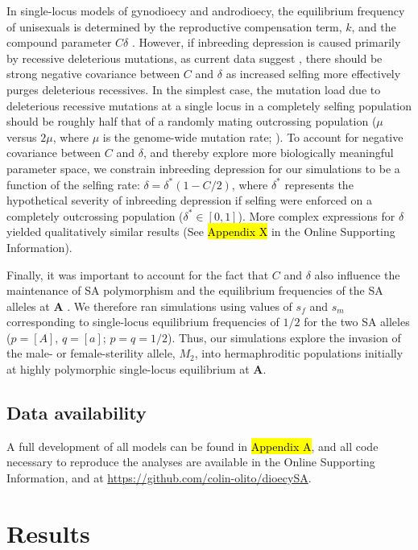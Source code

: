 \documentclass[9pt,twocolumn,twoside,lineno]{gsajnl}
\begin{document}
In single-locus models of gynodioecy and androdioecy, the equilibrium frequency of unisexuals is determined by the reproductive compensation term, $k$, and the compound parameter $C \delta$ \citep{Charlesworth1978a}. However, if inbreeding depression is caused primarily by recessive deleterious mutations, as current data suggest \citep{Charlesworth2009}, there should be strong negative covariance between $C$ and $\delta$ as increased selfing more effectively purges deleterious recessives. In the simplest case, the mutation load due to deleterious recessive mutations at a single locus in a completely selfing population should be roughly half that of a randomly mating outcrossing population ($\mu$ versus $2 \mu$, where $\mu$ is the genome-wide mutation rate; \citealt{OhtaCockerham1974}). To account for negative covariance between $C$ and $\delta$, and thereby explore more biologically meaningful parameter space, we constrain inbreeding depression for our simulations to be a function of the selfing rate: $\delta = \delta^\ast(1 - C/2)$, where $\delta^\ast$ represents the hypothetical severity of inbreeding depression if selfing were enforced on a completely outcrossing population ($\delta^\ast \in [0,1]$). More complex expressions for $\delta$ yielded qualitatively similar results (See \hl{Appendix X} in the Online Supporting Information). 

Finally, it was important to account for the fact that $C$ and $\delta$ also influence the maintenance of SA polymorphism and the equilibrium frequencies of the SA alleles at $\mathbf{A}$ \citep{JordanConnallon2014,Olito2017}. We therefore ran simulations using values of $s_f$ and $s_m$ corresponding to single-locus equilibrium frequencies of $1/2$ for the two SA alleles ($p = [A]$, $q = [a]$; $p=q=1/2$). Thus, our simulations explore the invasion of the male- or female-sterility allele, $M_2$, into hermaphroditic populations initially at highly polymorphic single-locus equilibrium at $\mathbf{A}$.


\subsection{Data availability}
A full development of all models can be found in \hl{Appendix A}, and all code necessary to reproduce the analyses are available in the Online Supporting Information, and at \url{https://github.com/colin-olito/dioecySA}.


\section{Results}
\end{document}
